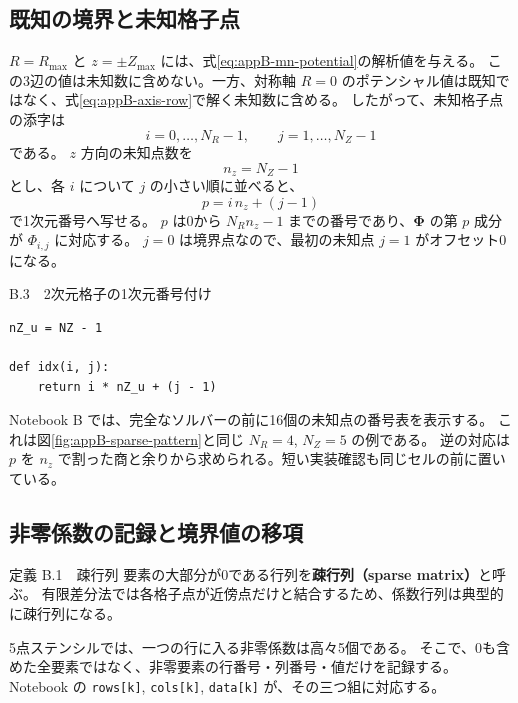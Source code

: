 \subsection{既知の境界と未知格子点}

$R=R_{\max}$ と $z=\pm Z_{\max}$ には、式\eqref{eq:appB-mn-potential}の解析値を与える。
この3辺の値は未知数に含めない。一方、対称軸 $R=0$ のポテンシャル値は既知ではなく、式\eqref{eq:appB-axis-row}で解く未知数に含める。
したがって、未知格子点の添字は
\begin{equation*}
 i=0,\ldots,N_R-1,\qquad j=1,\ldots,N_Z-1
\end{equation*}
である。
$z$ 方向の未知点数を
\begin{equation}
 n_z=N_Z-1
\end{equation}
とし、各 $i$ について $j$ の小さい順に並べると、
\begin{equation}
 \boxed{p=i\,n_z+(j-1)}
\label{eq:appB-index-map}
\end{equation}
で1次元番号へ写せる。
$p$ は0から $N_Rn_z-1$ までの番号であり、$\boldsymbol{\Phi}$ の第 $p$ 成分が $\Phi_{i,j}$ に対応する。
$j=0$ は境界点なので、最初の未知点 $j=1$ がオフセット0になる。

\begin{listingbox}{B.3　2次元格子の1次元番号付け}
\begin{Verbatim}[fontsize=\small]
nZ_u = NZ - 1

def idx(i, j):
    return i * nZ_u + (j - 1)
\end{Verbatim}
\end{listingbox}

Notebook B では、完全なソルバーの前に16個の未知点の番号表を表示する。
これは図\ref{fig:appB-sparse-pattern}と同じ $N_R=4$, $N_Z=5$ の例である。
逆の対応は $p$ を $n_z$ で割った商と余りから求められる。短い実装確認も同じセルの前に置いている。

\subsection{非零係数の記録と境界値の移項}

\begin{definitionbox}{定義 B.1　疎行列}
要素の大部分が0である行列を\textbf{疎行列（sparse matrix）}と呼ぶ。
有限差分法では各格子点が近傍点だけと結合するため、係数行列は典型的に疎行列になる。
\end{definitionbox}

5点ステンシルでは、一つの行に入る非零係数は高々5個である。
そこで、0も含めた全要素ではなく、非零要素の行番号・列番号・値だけを記録する。
Notebook の \texttt{rows[k]}, \texttt{cols[k]}, \texttt{data[k]} が、その三つ組に対応する。

